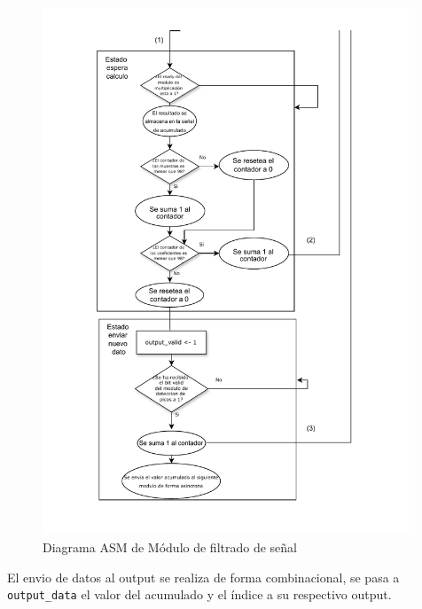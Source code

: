 \begin{figure}[h!]
    \centering
    \includegraphics[width=0.99\textwidth]{./Images/img_implementacion_hw/Diagramaasmfiltrado2.pdf}
    \caption{Diagrama ASM de Módulo de filtrado de señal}
    \label{fig:Diagramaasmfiltrado2}
\end{figure} 
\FloatBarrier
El envio de datos al output se realiza de forma combinacional, se pasa a \lstinline{output_data} el 
valor del acumulado y el índice a su respectivo output.

